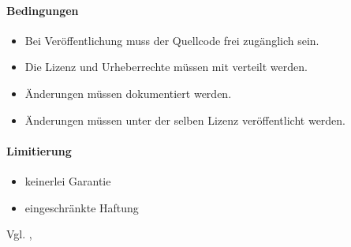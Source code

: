 \paragraph{Bedingungen}
\begin{itemize}
    \item Bei Veröffentlichung muss der Quellcode frei zugänglich sein.
    \item Die Lizenz und Urheberrechte müssen mit verteilt werden.
    \item Änderungen müssen dokumentiert werden.
    \item Änderungen müssen unter der selben Lizenz veröffentlicht werden.
\end{itemize}

\paragraph{Limitierung}
\begin{itemize}
    \item keinerlei Garantie
    \item eingeschränkte Haftung
\end{itemize}
Vgl. \cite{choosealicense-com}, \cite{gnu-why-upgrade-gplv3}


